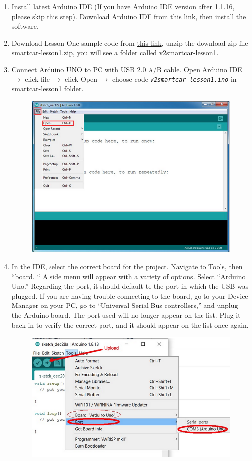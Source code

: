 \documentclass{article}
\begin{document}
	\begin{enumerate}
		\item Install latest Arduino IDE (If you have Arduino IDE version after 1.1.16, please skip this step). Download Arduino IDE from \href{https://www.arduino.cc/en/Main/Software?setlang=en}{this link}, then install the software.
		
		\item Download Lesson One sample code from \href{https://osoyoo.com/driver/v2smartcar-lesson1.zip}{this link}, unzip the download zip file smartcar-lesson1.zip, you will see a folder called v2smartcar-lesson1.
		
		\item Connect Arduino UNO to PC with USB 2.0 A/B cable. Open Arduino IDE $\rightarrow$ click file $\rightarrow$ click Open $\rightarrow$ choose code \texttt{\textit{v2smartcar-lesson1.ino}} in smartcar-lesson1 folder.
		
		\begin{figure}[H]
			\centering
			\includegraphics[width=0.7\linewidth]{Images/s1}
			\label{fig:s1}
		\end{figure}
		
		
		\item In the IDE, select the correct board for the project. Navigate to Tools, then “board. “ A side menu will appear with a variety of options. Select “Arduino Uno.” Regarding the port, it should default to the port in which the USB was plugged. If you are having trouble connecting to the board, go to your Device Manager on your PC, go to “Universal Serial Bus controllers,” and unplug the Arduino board. The port used will no longer appear on the list. Plug it back in to verify the correct port, and it should appear on the list once again.
		
		\begin{figure}[H]
			\centering
			\includegraphics[width=0.7\linewidth]{Images/s2}
			\label{fig:s2}
		\end{figure}
		

\end{enumerate}
\end{document}
